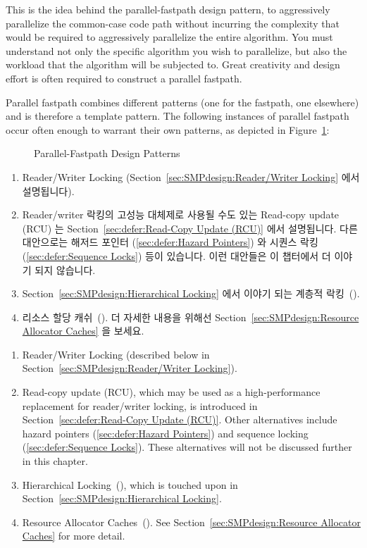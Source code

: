 This is the idea behind the parallel-fastpath design pattern, to aggressively
parallelize the common-case code path without incurring the complexity
that would be required to aggressively parallelize the entire algorithm.
You must understand not only the specific algorithm you wish
to parallelize, but also the workload that the algorithm will
be subjected to.  Great creativity and design
effort is often required to construct a parallel fastpath.

Parallel fastpath combines different patterns (one for the
fastpath, one elsewhere) and is therefore a template pattern.
The following instances of parallel
fastpath occur often enough to warrant their own patterns,
as depicted in Figure~\ref{fig:SMPdesign:Parallel-Fastpath Design Patterns}:

\fi

\begin{figure}[tbp]
\centering
{}
\caption{Parallel-Fastpath Design Patterns}
\label{fig:SMPdesign:Parallel-Fastpath Design Patterns}
\end{figure}

\begin{enumerate}
\item	Reader/Writer Locking
	(Section~\ref{sec:SMPdesign:Reader/Writer Locking} 에서 설명됩니다).
\item	Reader/writer 락킹의 고성능 대체제로 사용될 수도 있는 Read-copy update (RCU) 는
	Section~\ref{sec:defer:Read-Copy Update (RCU)} 에서 설명됩니다.
	다른 대안으로는 해저드 포인터
	(\cref{sec:defer:Hazard Pointers})
	와 시퀀스 락킹 (\cref{sec:defer:Sequence Locks}) 등이 있습니다.
	이런 대안들은 이 챕터에서 더 이야기 되지 않습니다.
\item	Section~\ref{sec:SMPdesign:Hierarchical Locking} 에서 이야기 되는
	계층적 락킹~(\cite{McKenney95b}).
\item	리소스 할당 캐쉬~(\cite{McKenney95b,McKenney93}).
	더 자세한 내용을 위해선
	Section~\ref{sec:SMPdesign:Resource Allocator Caches} 을 보세요.
\end{enumerate}

\iffalse

\begin{enumerate}
\item	Reader/Writer Locking
	(described below in Section~\ref{sec:SMPdesign:Reader/Writer Locking}).
\item	Read-copy update (RCU), which may be used as a high-performance
	replacement for reader/writer locking, is introduced in
	Section~\ref{sec:defer:Read-Copy Update (RCU)}.
	Other alternatives include hazard pointers
	(\cref{sec:defer:Hazard Pointers})
	and sequence locking (\cref{sec:defer:Sequence Locks}).
	These alternatives will not be discussed further in this chapter.
\item   Hierarchical Locking~(\cite{McKenney95b}), which is touched upon
	in Section~\ref{sec:SMPdesign:Hierarchical Locking}.
\item	Resource Allocator Caches~(\cite{McKenney95b,McKenney93}).
	See Section~\ref{sec:SMPdesign:Resource Allocator Caches}
	for more detail.
\end{enumerate}

